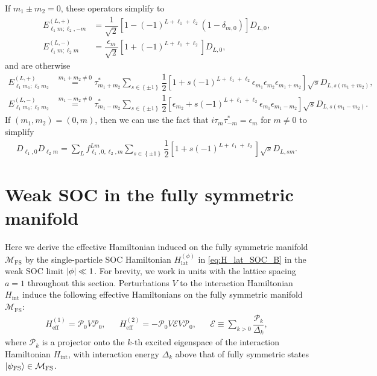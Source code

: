 \documentclass[nofootinbib,notitlepage,11pt]{revtex4-2}
\renewcommand{\t}{\text} %
\newcommand{\f}[2]{\dfrac{#1}{#2}} %
\newcommand{\p}[1]{\left(#1\right)} %
\renewcommand{\sp}[1]{\left[#1\right]} %
\renewcommand{\set}[1]{\left\{#1\right\}} %
\newcommand{\1}{\mathds{1}}
\newcommand{\E}{\mathcal{E}}
\newcommand{\M}{\mathcal{M}}
\renewcommand{\P}{\mathcal{P}}
\newcommand{\FS}{\text{FS}}
\begin{document}
If $m_1\pm m_2=0$, these operators simplify to
\begin{align}
  E_{\ell_1 m;\ell_2,-m}^{(L,+)}
  &= \f1{\sqrt{2}} \sp{1 - \p{-1}^{L+\ell_1+\ell_2}
    \p{1-\delta_{m,0}}} D_{L,0}, \\
  E_{\ell_1 m;\ell_2 m}^{(L,-)}
  &= \f{\epsilon_m}{\sqrt{2}}
  \sp{1 + \p{-1}^{L+\ell_1+\ell_2}} D_{L,0},
\end{align}
and are otherwise
\begin{align}
  E_{\ell_1 m_1;\ell_2 m_2}^{(L,+)}
  &\stackrel{m_1+m_2\ne0}{=}
  \tau_{m_1+m_2}^* \sum_{s\in\set{\pm1}}
  \f12 \sp{1 + s \p{-1}^{L+\ell_1+\ell_2}
    \epsilon_{m_1} \epsilon_{m_2} \epsilon_{m_1+m_2}}
  \sqrt{s} D_{L,s\p{m_1+m_2}}, \\
  E_{\ell_1 m_1;\ell_2 m_2}^{(L,-)}
  &\stackrel{m_1-m_2\ne0}{=}
  \tau_{m_1-m_2}^* \sum_{s\in\set{\pm1}}
  \f12 \sp{\epsilon_{m_2} + s \p{-1}^{L+\ell_1+\ell_2}
    \epsilon_{m_1} \epsilon_{m_1-m_2}}
  \sqrt{s} D_{L,s\p{m_1-m_2}}.
\end{align}
If $\p{m_1,m_2}=\p{0,m}$, then we can use the fact that
$i\tau_m\tau_{-m}^*=\epsilon_m$ for $m\ne0$ to simplify
\begin{align}
  D_{\ell_1,0} D_{\ell_2 m}
  = \sum_L f_{\ell_1,0,\ell_2,m}^{Lm}
  \sum_{s\in\set{\pm1}} \f12 \sp{1 + s \p{-1}^{L+\ell_1+\ell_2}}
  \sqrt{s} D_{L,sm}.
\end{align}

\section{Weak SOC in the fully symmetric manifold}
\label{sec:SOC_pert}

Here we derive the effective Hamiltonian induced on the fully
symmetric manifold $\M_\FS$ by the single-particle SOC Hamiltonian
$H_{\t{lat}}^{(\phi)}$ in \eqref{eq:H_lat_SOC_B} in the weak SOC limit
$\abs{\phi}\ll1$.  For brevity, we work in units with the lattice
spacing $a=1$ throughout this section.  Perturbations $V$ to the
interaction Hamiltonian $H_{\t{int}}$ induce the following effective
Hamiltonians on the fully symmetric manifold
$\M_\FS$\cite{bravyi2011schrieffer, perlin2019effective}:
\begin{align}
  H_{\t{eff}}^{(1)} = \P_0 V \P_0,
  &&
  H_{\t{eff}}^{(2)} = -\P_0 V \E V \P_0,
  &&
  \E \equiv \sum_{k>0} \f{\P_k}{\Delta_k},
  \label{eq:pert}
\end{align}
where $\P_k$ is a projector onto the $k$-th excited eigenspace of the
interaction Hamiltonian $H_{\t{int}}$, with interaction energy
$\Delta_k$ above that of fully symmetric states
$\ket{\psi_\FS}\in\M_\FS$.
\end{document}

